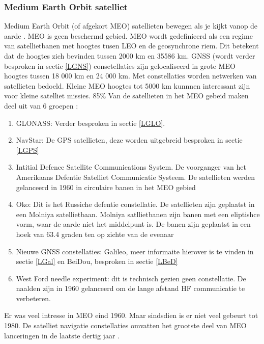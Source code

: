 \subsubsection{Medium Earth Orbit satelliet}
Medium Earth Orbit (of afgekort MEO) satellieten bewegen als je kijkt vanop de aarde \cite{LBibGEO}. MEO is geen beschermd gebied. MEO wordt gedefinieerd als een regime van satellietbanen met hoogtes tusen LEO en de geosynchrone riem. Dit betekent dat de hoogtes zich bevinden tussen 2000 km en 35586 km.  GNSS (wordt verder besproken in sectie \ref{LGNS}) consetellaties zijn gelocaliseerd in grote MEO hoogtes tussen 18 000 km en 24 000 km. Met constellaties worden netwerken van satellieten bedoeld. Kleine MEO hoogtes tot 5000 km kunnnen interessant zijn voor kleine satelliet missies. 85\% Van de satellieten in het MEO gebeid maken deel uit van 6 groepen \cite{LBibMEO}:

\begin{enumerate}
	\item GLONASS: Verder besproken in sectie \ref{LGLO}. 
	\item NavStar: De GPS satellieten, deze worden uitgebreid besproken in sectie \ref{LGPS}
	\item Intitial Defence Satellite Communications System. De voorganger van het Amerikaans Defentie Satelliet Communicatie Systeem. De satellieten werden gelanceerd in 1960 in circulaire banen in het MEO gebied
	\item  Oko: Dit is het Russiche defentie constellatie. De satellieten zijn geplaatst in een Molniya satellietbaan. Molniya satllietbanen zijn banen met een eliptishce vorm,  waar de aarde niet het middelpunt is. De banen zijn geplaatst in een hoek van 63.4 graden ten op zichte van de evenaar
	\item Nieuwe GNSS constellaties: Galileo, meer informaite hierover is te vinden in sectie \ref{LGal} en BeiDou, besproken in sectie \ref{LBeD}
	\item West Ford needle experiment: dit is technisch gezien geen constellatie. De naalden zijn in 1960 gelanceerd om de lange afstand HF communicatie te verbeteren. 
\end{enumerate}
Er was veel intresse in MEO eind 1960. Maar sindsdien is er niet veel gebeurt tot 1980. De satelliet navigatie constellaties omvatten het grootste deel van MEO lanceringen in de laatste dertig jaar \cite{LBibMEO}.

